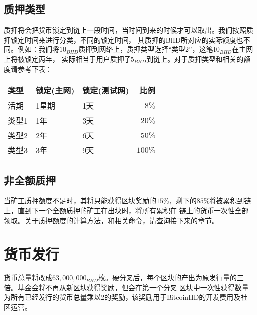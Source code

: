 \subsection{质押类型}
\begin{flushleft}
    质押将会把货币锁定到链上一段时间，当时间到来的时候才可以取出。我们按照质押锁定时间来进行分类，不同的锁定时间，
    其质押的BHD所对应的实际额度也不同。例如：我们将$10_{BHD}$质押到网络上，质押类型选择``类型2''，这笔$10_{BHD}$在主网上将被锁定两年，
    实际相当于用户质押了$5_{BHD}$到链上。对于质押类型和相关的额度请参考下表：
\end{flushleft}
\begin{tabular}{ |p{3cm}|p{3cm}|p{3cm}|r| }
    \hline
    \rowcolor{lightgray} 类型 & 锁定(主网) & 锁定(测试网) & 比例 \\[5pt]
    \hline
    活期 & 1星期 & 1天 & $8\%$ \\[5pt]
    \rowcolor{lightgray!30} 类型1 & 1年 & 3天 & $20\%$ \\[5pt]
    类型2 & 2年 & 6天 & $50\%$ \\[5pt]
    \rowcolor{lightgray!30} 类型3 & 3年 & 9天 & $100\%$ \\[5pt]
    \hline
\end{tabular}
\subsection{非全额质押}
\begin{flushleft}
    当矿工质押额度不足时，其将只能获得区块奖励的$15\%$，剩下的$85\%$将被累积到链上，直到下一个全额质押的矿工在出块时，将所有累积在
    链上的货币一次性全部领取。关于质押额度的计算方法，和相关命令，请查询接下来的章节。
\end{flushleft}
\section{货币发行}
\begin{flushleft}
    货币总量将改成$63,000,000_{BHD}$枚。硬分叉后，每个区块的产出为原发行量的三倍。基金会将不再从新区块获得奖励，但会在第一个分叉
    区块中一次性获得数量为所有已经发行的货币总量乘以2的奖励，该奖励用于BitcoinHD的开发费用及社区运营。
\end{flushleft}
